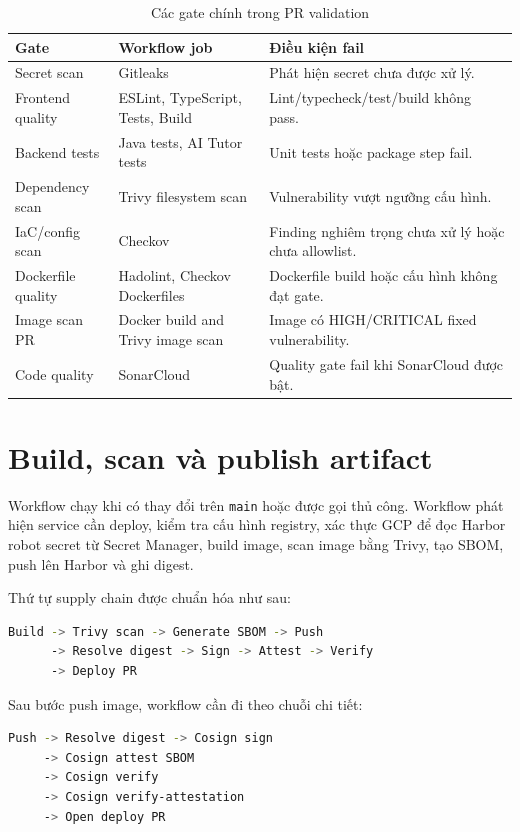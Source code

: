 \begin{table}[H]
\centering
\caption{Các gate chính trong PR validation}
\label{tab:pr-gates}
\begin{tabularx}{\textwidth}{p{}p{}Y}
\toprule
\textbf{Gate} & \textbf{Workflow job} & \textbf{Điều kiện fail} \\
\midrule
Secret scan & Gitleaks & Phát hiện secret chưa được xử lý. \\
Frontend quality & ESLint, TypeScript, Tests, Build & Lint/typecheck/test/build không pass. \\
Backend tests & Java tests, AI Tutor tests & Unit tests hoặc package step fail. \\
Dependency scan & Trivy filesystem scan & Vulnerability vượt ngưỡng cấu hình. \\
IaC/config scan & Checkov & Finding nghiêm trọng chưa xử lý hoặc chưa allowlist. \\
Dockerfile quality & Hadolint, Checkov Dockerfiles & Dockerfile build hoặc cấu hình không đạt gate. \\
Image scan PR & Docker build and Trivy image scan & Image có HIGH/CRITICAL fixed vulnerability. \\
Code quality & SonarCloud & Quality gate fail khi SonarCloud được bật. \\
\bottomrule
\end{tabularx}
\end{table}

\section{Build, scan và publish artifact}

Workflow  chạy khi có thay đổi trên \texttt{main} hoặc được gọi thủ công. Workflow phát hiện service cần deploy, kiểm tra cấu hình registry, xác thực GCP để đọc Harbor robot secret từ Secret Manager, build image, scan image bằng Trivy, tạo SBOM, push lên Harbor và ghi digest.

Thứ tự supply chain được chuẩn hóa như sau:

\begin{lstlisting}[language=bash]
Build -> Trivy scan -> Generate SBOM -> Push
      -> Resolve digest -> Sign -> Attest -> Verify
      -> Deploy PR
\end{lstlisting}

Sau bước push image, workflow cần đi theo chuỗi chi tiết:

\begin{lstlisting}[language=bash]
Push -> Resolve digest -> Cosign sign
     -> Cosign attest SBOM
     -> Cosign verify
     -> Cosign verify-attestation
     -> Open deploy PR
\end{lstlisting}

